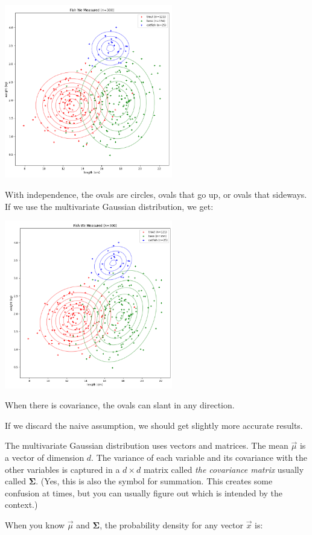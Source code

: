 \includegraphics[width=0.55\textwidth]{4_indep_density.png}

With independence,   the ovals are circles,  ovals that go up, or ovals that sideways.  If we use the multivariate Gaussian distribution, we get:

\includegraphics[width=0.55\textwidth]{5_full.png}

When there is covariance,  the ovals can slant in any direction.

If we discard the naive assumption,  we should get slightly more accurate results.

The multivariate Gaussian distribution uses vectors and matrices.  The mean $\vec{\mu}$ is a vector of dimension $d$.    The variance of each variable and its covariance with the other variables is captured in a $d \times d$ matrix called \textit{the covariance matrix} usually called $\boldsymbol\Sigma$.  (Yes, this is also the symbol for summation.  This creates some confusion at times, but you can usually figure out which is intended by the context.)

When you know $\vec{\mu}$ and $\boldsymbol\Sigma$,  the probability density for any vector $\vec{x}$ is:

